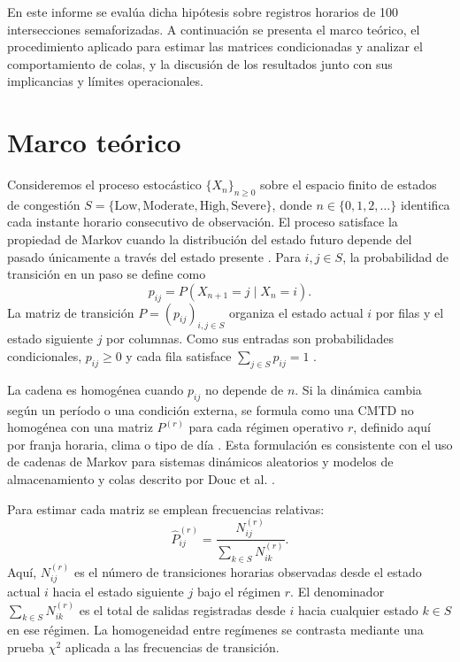 \documentclass[conference]{IEEEtran}
\begin{document}
En este informe se evalúa dicha hipótesis sobre registros horarios de 100 intersecciones semaforizadas. A continuación se presenta el marco teórico, el procedimiento aplicado para estimar las matrices condicionadas y analizar el comportamiento de colas, y la discusión de los resultados junto con sus implicancias y límites operacionales.

\section{Marco teórico}
Consideremos el proceso estocástico $\{X_n\}_{n\geq 0}$ sobre el espacio finito de estados de congestión
$S=\{\mathrm{Low},\mathrm{Moderate},\mathrm{High},\mathrm{Severe}\}$, donde
$n\in\{0,1,2,\ldots\}$ identifica cada instante horario consecutivo de observación.
El proceso satisface la propiedad de Markov cuando la distribución del estado futuro depende
del pasado únicamente a través del estado presente \cite{perez2026cmtd}. Para $i,j\in S$,
la probabilidad de transición en un paso se define como
\begin{equation}
p_{ij}=P(X_{n+1}=j\mid X_n=i).
\end{equation}
La matriz de transición $P=(p_{ij})_{i,j\in S}$ organiza el estado actual $i$ por filas
y el estado siguiente $j$ por columnas. Como sus entradas son probabilidades condicionales,
$p_{ij}\geq 0$ y cada fila satisface $\sum_{j\in S}p_{ij}=1$ \cite{perez2026cmtd}.

La cadena es homogénea cuando $p_{ij}$ no depende de $n$. Si la dinámica cambia según
un período o una condición externa, se formula como una CMTD no homogénea con una matriz
$P^{(r)}$ para cada régimen operativo $r$, definido aquí por franja horaria, clima o tipo
de día \cite{perez2026cmtd}. Esta formulación es consistente con el uso de cadenas de
Markov para sistemas dinámicos aleatorios y modelos de almacenamiento y colas descrito
por Douc et al. \cite{douc2018markov}.

Para estimar cada matriz se emplean frecuencias relativas:
\begin{equation}
\widehat{P}_{ij}^{(r)}=
\frac{N_{ij}^{(r)}}{\sum_{k\in S}N_{ik}^{(r)}}.
\end{equation}
Aquí, $N_{ij}^{(r)}$ es el número de transiciones horarias observadas desde el estado
actual $i$ hacia el estado siguiente $j$ bajo el régimen $r$. El denominador
$\sum_{k\in S}N_{ik}^{(r)}$ es el total de salidas registradas desde $i$ hacia cualquier
estado $k\in S$ en ese régimen. La homogeneidad entre regímenes se contrasta mediante una
prueba $\chi^2$ aplicada a las frecuencias de transición.
\end{document}
